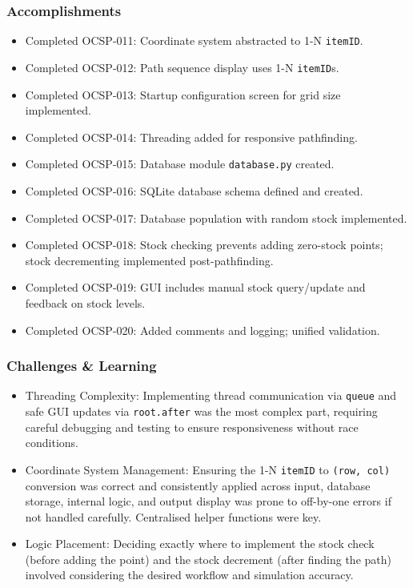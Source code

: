 	\subsubsection{Accomplishments}
	\begin{itemize}
		\item Completed OCSP-011: Coordinate system abstracted to 1-N \verb|itemID|.
		\item Completed OCSP-012: Path sequence display uses 1-N \verb|itemID|s.
		\item Completed OCSP-013: Startup configuration screen for grid size implemented.
		\item Completed OCSP-014: Threading added for responsive pathfinding.
		\item Completed OCSP-015: Database module \verb|database.py| created.
		\item Completed OCSP-016: SQLite database schema defined and created.
		\item Completed OCSP-017: Database population with random stock implemented.
		\item Completed OCSP-018: Stock checking prevents adding zero-stock points; stock decrementing implemented post-pathfinding.
		\item Completed OCSP-019: GUI includes manual stock query/update and feedback on stock levels.
		\item Completed OCSP-020: Added comments and logging; unified validation.
	\end{itemize}
	
	\subsubsection{Challenges \& Learning}
	\begin{itemize}
		\item Threading Complexity: Implementing thread communication via \verb|queue| and safe GUI updates via \verb|root.after| was the most complex part, requiring careful debugging and testing to ensure responsiveness without race conditions.
		\item Coordinate System Management: Ensuring the 1-N \verb|itemID| to \verb|(row, col)| conversion was correct and consistently applied across input, database storage, internal logic, and output display was prone to off-by-one errors if not handled carefully. Centralised helper functions were key.
		\item Logic Placement: Deciding exactly where to implement the stock check (before adding the point) and the stock decrement (after finding the path) involved considering the desired workflow and simulation accuracy.
	\end{itemize}
	
